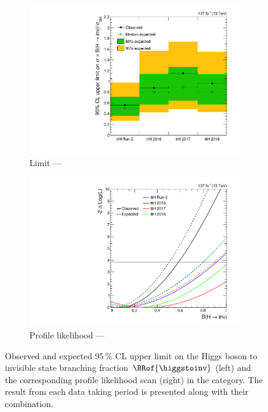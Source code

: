 \begin{figure}[htbp]
    \centering
    \begin{subfigure}[t]{0.45\textwidth}
        \includegraphics[width=\textwidth]{figures/limits/ttH/limit_Run2_ttH.pdf}
        \caption{Limit --- \ttH}
    \end{subfigure}
    \hspace{0.05\textwidth}
    \begin{subfigure}[t]{0.45\textwidth}
        \includegraphics[width=\textwidth]{figures/likelihood_scan/profile_likelihood_scan_Run2_ttH.pdf}
        \caption{Profile likelihood --- \ttH}
    \end{subfigure}
    \caption[Observed and expected 95\,\% CL upper limit on the Higgs boson to invisible state branching fraction $\BRof{\higgstoinv}$ (left) and the corresponding profile likelihood scan (right) in the \ttH category]{Observed and expected 95\,\% CL upper limit on the Higgs boson to invisible state branching fraction $\BRof{\higgstoinv}$ (left) and the corresponding profile likelihood scan (right) in the \ttH category. The result from each data taking period is presented along with their combination.}
    \label{fig:htoinv_limit_ttH}
\end{figure}

